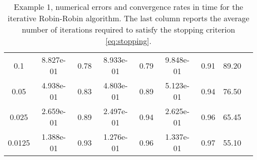 \documentclass[11pt]{article}
\begin{document}
\begin{table}[htb!]
\begin{tabular}{|c|c|c|c|c|c|c|c|c|}
		{\small{}0.1} & {\small{}8.827e-01    } & {\small{}0.78 } & {\small{}   8.933e-01     } & {\small{} 0.79} & {\small{}9.848e-01     } & {\small{}0.91 }  &{\small{}89.20 }\tabularnewline
		
		{\small{}0.05} & {\small{} 4.938e-01     } & {\small{}0.83 } & {\small{} 4.803e-01     } & {\small{}0.89 } & {\small{}5.123e-01       } & {\small{}0.94} &{\small{}76.50 }\tabularnewline
		
		{\small{}0.025} & {\small{} 2.659e-01   } & {\small{}0.89 } & {\small{} 2.497e-01   } & {\small{}0.94 } & {\small{}2.625e-01       } & {\small{} 0.96}  &{\small{} 65.45}\tabularnewline
		
		{\small{}0.0125} & {\small{}  1.388e-01      } & {\small{}0.93  } & {\small{} 1.276e-01      } & {\small{}0.96 } & {\small{}   1.337e-01   } & {\small{} 0.97 }  &{\small{}55.10  }\tabularnewline
		\hline
	\end{tabular}
\caption{Example 1, numerical errors and convergence rates in time 
  for the iterative Robin-Robin algorithm. The last column reports the average number of iterations required to satisfy the stopping criterion \eqref{eq:stopping}.}
\label{tab:Errors-Convergence rates-2}
\end{table}
\end{document}
